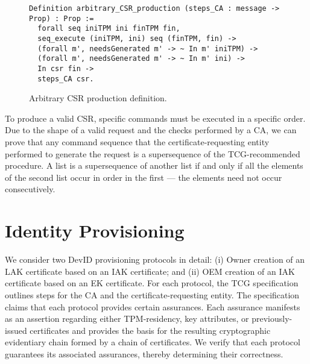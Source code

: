 \documentclass[runningheads]{llncs}
\begin{document}

\begin{figure}[hbtp]
  \vspace{-\medskipamount}
  \vspace{-\medskipamount}
  \begin{lstlisting}[language=Coq]
Definition arbitrary_CSR_production (steps_CA : message -> Prop) : Prop :=
  forall seq iniTPM ini finTPM fin,
  seq_execute (iniTPM, ini) seq (finTPM, fin) ->
  (forall m', needsGenerated m' -> ~ In m' iniTPM) ->
  (forall m', needsGenerated m' -> ~ In m' ini) ->
  In csr fin ->
  steps_CA csr.
  \end{lstlisting}
  \caption{Arbitrary CSR production definition.}
  \label{fig:csr-production}
\end{figure}



To produce a valid CSR, specific commands
must be executed in a specific order.  Due to the shape of a valid
request and the checks performed by a CA, we can prove that any
command sequence that the certificate-requesting entity performed to
generate the request is a supersequence of the TCG-recommended procedure. 
A list is a supersequence of another list if and only if all the elements 
of the second list occur in order in the first --- the elements need not
occur consecutively.  

\section{Identity Provisioning}

We consider two DevID provisioning protocols in detail: (i) Owner
creation of an LAK certificate based on an IAK certificate; and (ii)
OEM creation of an IAK certificate based on an EK certificate. For
each protocol, the TCG specification outlines steps for the CA and the
certificate-requesting entity. The specification claims that each
protocol provides certain assurances. Each assurance manifests as
an assertion regarding either TPM-residency, key attributes, or
previously-issued certificates and provides the basis for the
resulting cryptographic evidentiary chain formed by a chain of
certificates. We verify that each protocol guarantees its associated
assurances, thereby determining their correctness.
\end{document}
